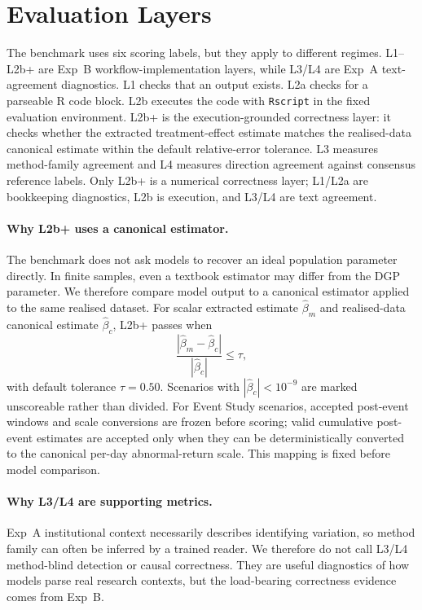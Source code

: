 \documentclass{article}
\begin{document}
\section{Evaluation Layers}

The benchmark uses six scoring labels, but they apply to different
regimes. L1--L2b+ are Exp~B workflow-implementation layers, while L3/L4
are Exp~A text-agreement diagnostics. L1 checks that an output exists.
L2a checks for a parseable R code block. L2b executes the code with
\texttt{Rscript} in the fixed evaluation environment. L2b+ is the
execution-grounded correctness layer: it checks whether the extracted
treatment-effect estimate matches the realised-data canonical estimate
within the default relative-error tolerance. L3 measures method-family
agreement and L4 measures direction agreement against consensus reference
labels. Only L2b+ is a numerical correctness layer; L1/L2a are
bookkeeping diagnostics, L2b is execution, and L3/L4 are text agreement.

\paragraph{Why L2b+ uses a canonical estimator.}
The benchmark does not ask models to recover an ideal population
parameter directly. In finite samples, even a textbook estimator may
differ from the DGP parameter. We therefore compare model output to a
canonical estimator applied to the same realised dataset. For scalar
extracted estimate $\hat{\beta}_m$ and realised-data canonical estimate
$\hat{\beta}_c$, L2b+ passes when
\[
\frac{|\hat{\beta}_m-\hat{\beta}_c|}{|\hat{\beta}_c|} \le \tau ,
\]
with default tolerance $\tau=0.50$. Scenarios with
$|\hat{\beta}_c|<10^{-9}$ are marked unscoreable rather than divided. For
Event Study scenarios, accepted post-event windows and scale conversions
are frozen before scoring; valid cumulative post-event estimates are
accepted only when they can be deterministically converted to the
canonical per-day abnormal-return scale. This mapping is fixed before
model comparison.

\paragraph{Why L3/L4 are supporting metrics.}
Exp~A institutional context necessarily describes identifying variation,
so method family can often be inferred by a trained reader. We therefore
do not call L3/L4 method-blind detection or causal correctness. They are
useful diagnostics of how models parse real research contexts, but the
load-bearing correctness evidence comes from Exp~B.
\end{document}
